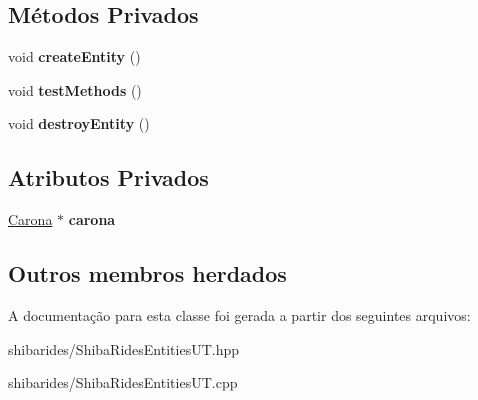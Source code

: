 \subsection*{Métodos Privados}
\begin{DoxyCompactItemize}
\item 
void {\bfseries create\+Entity} ()\hypertarget{classshibarides_1_1TUCarona_a37d1b8d44171407c3b26f7b68561a952}{}\label{classshibarides_1_1TUCarona_a37d1b8d44171407c3b26f7b68561a952}

\item 
void {\bfseries test\+Methods} ()\hypertarget{classshibarides_1_1TUCarona_a362022eb77c3b61b630e00580cf12f07}{}\label{classshibarides_1_1TUCarona_a362022eb77c3b61b630e00580cf12f07}

\item 
void {\bfseries destroy\+Entity} ()\hypertarget{classshibarides_1_1TUCarona_a1b281d4e9498bff24112d9aebe59c825}{}\label{classshibarides_1_1TUCarona_a1b281d4e9498bff24112d9aebe59c825}

\end{DoxyCompactItemize}
\subsection*{Atributos Privados}
\begin{DoxyCompactItemize}
\item 
\hyperlink{classshibarides_1_1Carona}{Carona} $\ast$ {\bfseries carona}\hypertarget{classshibarides_1_1TUCarona_ac8fe3dab16c78e6436e1b0750aced08b}{}\label{classshibarides_1_1TUCarona_ac8fe3dab16c78e6436e1b0750aced08b}

\end{DoxyCompactItemize}
\subsection*{Outros membros herdados}


A documentação para esta classe foi gerada a partir dos seguintes arquivos\+:\begin{DoxyCompactItemize}
\item 
shibarides/Shiba\+Rides\+Entities\+U\+T.\+hpp\item 
shibarides/Shiba\+Rides\+Entities\+U\+T.\+cpp\end{DoxyCompactItemize}
